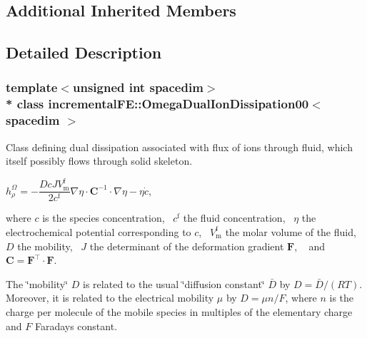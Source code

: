 \subsection*{Additional Inherited Members}


\subsection{Detailed Description}
\subsubsection*{template$<$unsigned int spacedim$>$\\*
class incremental\+F\+E\+::\+Omega\+Dual\+Ion\+Dissipation00$<$ spacedim $>$}

Class defining dual dissipation associated with flux of ions through fluid, which itself possibly flows through solid skeleton.

$ h^\Omega_\rho = -\dfrac{D c J V^\mathrm{f}_\mathrm{m}}{2 c^\mathrm{f}} \nabla\eta \cdot \boldsymbol{C}^{-1} \cdot \nabla\eta - \eta \dot{c} $,

where $c$ is the species concentration,~\newline
 $c^\mathrm{f}$ the fluid concentration,~\newline
 $\eta$ the electrochemical potential corresponding to $c$,~\newline
 $V^\mathrm{f}_\mathrm{m}$ the molar volume of the fluid,~\newline
 $D$ the mobility,~\newline
 $J$ the determinant of the deformation gradient $\boldsymbol{F}$, ~\newline
 and $\boldsymbol{C} = \boldsymbol{F}^\top\cdot \boldsymbol{F}$.

The \char`\"{}mobility\char`\"{} $D$ is related to the usual \char`\"{}diffusion constant\char`\"{} $ \bar D $ by $D = \bar D/(RT)$. Moreover, it is related to the electrical mobility $\mu$ by $ D = \mu n/F$, where $n$ is the charge per molecule of the mobile species in multiples of the elementary charge and $F$ Faraday\textquotesingle{}s constant.

